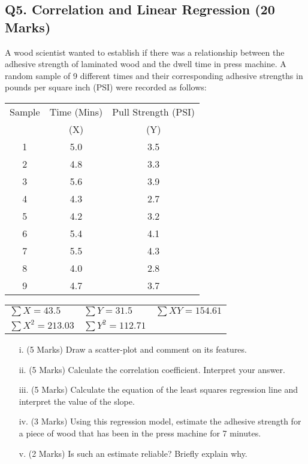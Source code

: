 \documentclass[a4paper,12pt]{article}
\begin{document}
\newpage
\subsection*{Q5. Correlation and Linear Regression (20 Marks)} %

A wood scientist wanted to establish if there was a relationship between the adhesive strength of laminated wood and the dwell time in press machine. A random sample of 9 different times and their corresponding adhesive strengths in pounds per square inch (PSI) were recorded as follows:

\begin{center}
\begin{tabular}{|c|c|c|}

  \hline
Sample &Time (Mins) & Pull Strength (PSI) \\
 & (X)  &  (Y)\\ \hline
1& 5.0& 3.5 \\
2& 4.8& 3.3\\
3& 5.6& 3.9\\
4& 4.3& 2.7\\
5& 4.2& 3.2\\
6& 5.4& 4.1\\
7& 5.5& 4.3\\
8& 4.0& 2.8\\
9& 4.7& 3.7\\
  \hline
\end{tabular}
\bigskip

\begin{tabular}{lll}
  $\sum X = 43.5$ & $\sum Y = 31.5$ & $\sum XY = 154.61$ \\
  $\sum X^2 = 213.03$ & $\sum Y^2 = 112.71$ &  \\
 \end{tabular}
 \end{center}

\begin{itemize}
\item[i.](5 Marks) Draw a scatter-plot and comment on its features.
\item[ii.](5 Marks) Calculate the correlation coefficient. Interpret your answer.
\item[iii.](5 Marks) Calculate the equation of the least squares regression line and interpret the value of the slope.
\item[iv.](3 Marks) Using this regression model, estimate the adhesive strength for a piece of wood that has been in the press machine for 7 minutes.
\item[v.](2 Marks) Is such an estimate reliable? Briefly explain why.
\end{itemize}
\end{document}
